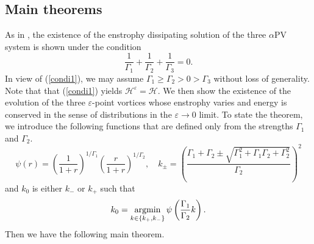 \documentclass{article}
\newcommand{\argmin}{\mathop{\rm argmin}\limits}
\theoremstyle{definition}
\begin{document}
\subsection{Main theorems}
\label{Main}
As  in \cite{G.2}, the existence of the enstrophy dissipating solution of the three $\alpha$PV system is shown under the condition
\begin{equation}
\frac{1}{\Gamma_1} + \frac{1}{\Gamma_2} + \frac{1}{\Gamma_3} = 0.  \label{condi1} 
\end{equation}
In view of (\ref{condi1}), we may assume $\Gamma_1 \geq \Gamma_2 > 0 > \Gamma_3$ without loss of generality. Note that that (\ref{condi1}) yields $\mathscr{H}^\varepsilon = \mathscr{H}$. We then show the existence of the evolution of the three $\varepsilon$-point vortices whose enstrophy varies and energy is conserved in the sense of distributions in the $\varepsilon \rightarrow 0$ limit. To state the theorem, we introduce the following functions that are defined only from the strengths 
$\Gamma_1$ and $\Gamma_2$.
\begin{equation}
\psi(r) = \left( \frac{1}{1+r} \right)^{1/\Gamma_1}  \left( \frac{r}{1+r} \right)^{1/\Gamma_2}, \quad k_\pm = \left( \frac{\Gamma_1 + \Gamma_2 \pm \sqrt{\Gamma_1^2 + \Gamma_1 \Gamma_2 + \Gamma_2^2}}{\Gamma_2} \right)^2 \label{k_pm}
\end{equation}
and $k_0$ is either $k_-$ or $k_+$ such that  
\begin{equation*}
 k_0 = \argmin_{k \in \{ k_+, k_-\}} \psi\left( \frac{\Gamma_1}{\Gamma_2} k\right). 
\end{equation*}
Then we have the following main theorem.
\end{document}
